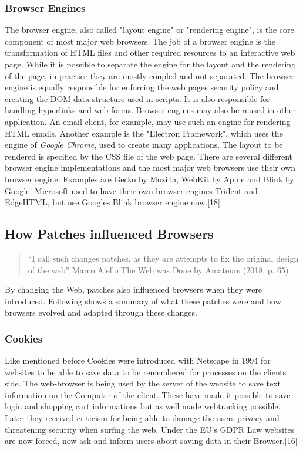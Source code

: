 \documentclass[runningheads]{llncs}
\begin{document}
		\subsubsection{Browser Engines}
		\leavevmode\newline
		The browser engine, also called "layout engine" or "rendering engine", is the core component of most major web browsers. The job of a browser engine is the transformation of HTML files and other required resources to an interactive web page. While it is possible to separate the engine for the layout and the rendering of the page, in practice they are mostly coupled and not separated. The browser engine is equally responsible for enforcing the web pages security policy and creating the DOM data structure used in scripts. It is also responsible for handling hyperlinks and web forms.
		Browser engines may also be reused in other application. An email client, for example, may use such an engine for rendering HTML emails. Another example is the "Electron Framework", which uses the engine of \textit{Google Chrome}, used to create many applications. The layout to be rendered is specified by the CSS file of the web page. There are several different browser engine implementations and the most major web browsers use their own browser engine. Examples are Gecko by Mozilla, WebKit by Apple and Blink by Google. Microsoft used to have their own browser engines Trident and EdgeHTML, but use Googles Blink browser engine now.[18]
		
		\subsection{How Patches influenced Browsers}
			\begin{quote}``I call such changes patches, as they are attempts to fix the original design of the web'' Marco Aiello The Web was Done by Amateurs (2018, p. 65)\end{quote}
		By changing the Web, patches also influenced browsers when they were introduced. Following shows a summary of what these patches were and how browsers evolved and adapted through these changes.
			\subsubsection{Cookies}
			\leavevmode\newline
			Like mentioned before Cookies were introduced with Netscape in 1994 for websites to be able to save data to be remembered for processes on the clients side. The web-browser is being used by the server of the website to save text information on the Computer of the client. These have made it possible to save login and shopping cart informations but as well made webtracking possible. Later they received criticism for being able to damage the users privacy and threatening security when surfing the web. Under the EU's GDPR Law websites are now forced, now ask and inform users about saving data in their Browser.[16]
\end{document}
